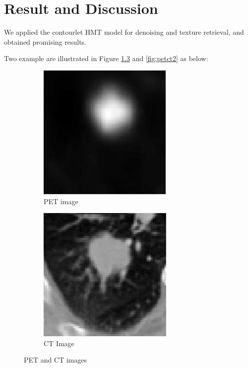 \chapter{Result and Discussion}
\label{chap:result}
We applied the contourlet HMT model for denoising and texture retrieval, and obtained promising results.

Two example are illustrated in Figure \ref{fig:petct1} and \ref{fig:petct2} as below:

\begin{figure}[h]
	\centering
	\begin{subfigure}{.5\textwidth}
		\centering
		\includegraphics[width=.8\linewidth]{fig/pet1}
		\caption{PET image}
		\label{fig:sub1}
	\end{subfigure}%
	\begin{subfigure}{.5\textwidth}
		\centering
		\includegraphics[width=.8\linewidth]{fig/ct1}
		\caption{CT Image}
		\label{fig:sub2}
	\end{subfigure}
	\caption{PET and CT images}
	\label{fig:petct1}
\end{figure}

